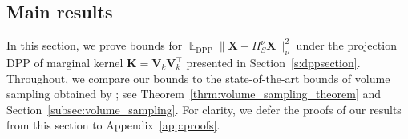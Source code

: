 \documentclass[twoside,11pt]{book}
\newtheorem{proposition}{Proposition}
\DeclareMathOperator{\Det}{Det}
\DeclareMathOperator{\Fr}{\mathrm{Fr}}
\DeclareMathOperator{\DPP}{\mathrm{DPP}}
\DeclareMathOperator{\VS}{\mathrm{VS}}
\DeclareMathOperator{\Tran}{\intercal}
\DeclareMathOperator{\EX}{\mathbb{E}}
\DeclareMathOperator{\Prb}{\mathbb{P}}
\begin{document}
\subsection{Main results}
In this section, we prove bounds for $\EX_{\DPP} \| \bm{X} - \Pi_{S}^{\nu}\bm{X} \|^2_{\nu}$ under the projection DPP of marginal kernel $\bm{K} = \bm{V}^{}_{k}\bm{V}^{\Tran}_{k}$ presented in Section~\ref{s:dppsection}. Throughout, we compare our bounds to the state-of-the-art bounds of volume sampling obtained by \cite{DRVW06}; see Theorem~\ref{thrm:volume_sampling_theorem} and Section~\ref{subsec:volume_sampling}. For clarity, we defer the proofs of our results from this section to Appendix~\ref{app:proofs}.

%

\end{document}
